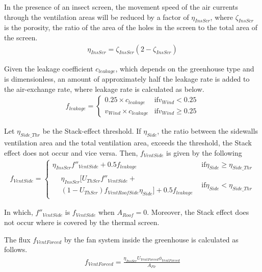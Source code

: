 \documentclass[a4paper]{article}
\begin{document}
In the presence of an insect screen, the movement speed of the air currents through the ventilation areas will be reduced by a factor of \(\eta_{InsScr}\), where \(\zeta_{InsScr}\) is the porosity, the ratio of the area of the holes in the screen to the total area of the screen.
\begin{gather}
  \eta_{InsScr} = \zeta_{InsScr} (2 -  \zeta_{InsScr})
\end{gather}

Given the leakage coefficient \(c_{leakage}\), which depends on the greenhouse type and is dimensionless, an amount of approximately half the leakage rate is added to the air-exchange rate, where leakage rate is calculated as below.
\begin{gather}
  f_{leakage} = \begin{cases}
    0.25 \times c_{leakage}     & \text{if} v_{Wind} < 0.25    \\
    v_{Wind} \times c_{leakage} & \text{if} v_{Wind} \geq 0.25
  \end{cases}
\end{gather}

Let \(\eta_{Side\_Thr}\) be the Stack-effect threshold. If \(\eta_{Side}\), the ratio between the sidewalls ventilation
area and the total ventilation area, exceeds the threshold, the Stack effect does not occur and vice versa. Then, \(f_{VentSide}\) is given by the following
\begin{gather}
  f_{VentSide} =
  \begin{cases}
    \eta_{InsScr} f''_{VentSide} + 0.5f_{leakage} & \text{if} \eta_{Side} \geq \eta_{Side\_Thr} \\
    \begin{split}
      & \eta_{InsScr} [U_{ThScr}f''_{VentSide} + \\
      & (1-U_{ThScr})f_{VentRoofSide} \eta_{Side}] + 0.5 f_{leakage}
    \end{split}                    & \text{if} \eta_{Side} < \eta_{Side\_Thr}
  \end{cases}
\end{gather}

In which,  \(f''_{VentSide}\) is  \(f_{VentSide}\) when \(A_{Roof} = 0\).
Moreover, the Stack effect does not occur where is covered by the thermal screen.

The flux \(f_{VentForced}\) by the fan system inside the greenhouse is calculated as follows.
\begin{gather}
  f_{VentForced} = \frac{\eta_{InsScr} U_{VentForced} \phi_{VentForced} } {A_{Flr}}
\end{gather}
\end{document}
